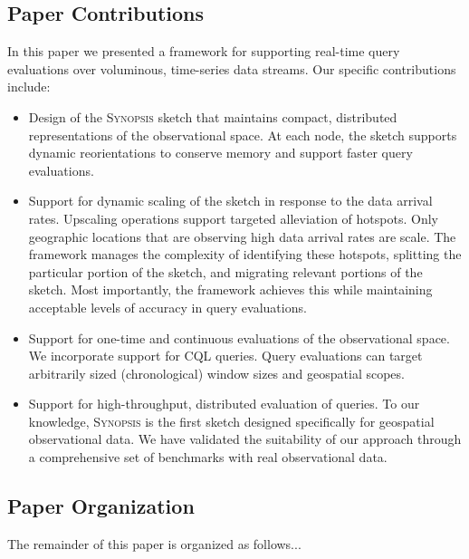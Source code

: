 \subsection{Paper Contributions}
In this paper we presented a framework for supporting real-time query evaluations over voluminous, time-series data streams. Our specific contributions include:
\begin{itemize}
\item   Design of the \textsc{Synopsis} sketch that maintains compact, distributed representations of the observational space. At each node, the sketch supports dynamic reorientations to conserve memory and support faster query evaluations.
\item   Support for dynamic scaling of the sketch in response to the data arrival rates. Upscaling operations support targeted alleviation of hotspots. Only geographic locations that are observing high data arrival rates are scale. The framework manages the complexity of identifying these hotspots, splitting the particular portion of the sketch, and migrating relevant portions of the sketch. Most importantly, the framework achieves this while maintaining acceptable levels of accuracy in query evaluations.
\item   Support for one-time and continuous evaluations of the observational space. We incorporate support for CQL queries. Query evaluations can target arbitrarily sized (chronological) window sizes and geospatial scopes.
\item   Support for high-throughput, distributed evaluation of queries.
To our knowledge, \textsc{Synopsis} is the first sketch designed specifically for geospatial observational data. We have validated the suitability of our approach through a comprehensive set of benchmarks with real observational data. 
\end{itemize}

\subsection{Paper Organization}
The remainder of this paper is organized as follows...


